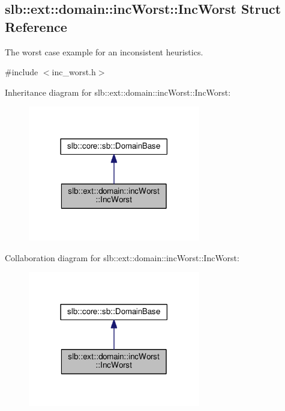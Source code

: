 \hypertarget{structslb_1_1ext_1_1domain_1_1incWorst_1_1IncWorst}{}\subsection{slb\+:\+:ext\+:\+:domain\+:\+:inc\+Worst\+:\+:Inc\+Worst Struct Reference}
\label{structslb_1_1ext_1_1domain_1_1incWorst_1_1IncWorst}


The worst case example for an inconsistent heuristics.  




{\ttfamily \#include $<$inc\+\_\+worst.\+h$>$}



Inheritance diagram for slb\+:\+:ext\+:\+:domain\+:\+:inc\+Worst\+:\+:Inc\+Worst\+:\nopagebreak
\begin{figure}[H]
\begin{center}
\leavevmode
\includegraphics[width=213pt]{structslb_1_1ext_1_1domain_1_1incWorst_1_1IncWorst__inherit__graph}
\end{center}
\end{figure}


Collaboration diagram for slb\+:\+:ext\+:\+:domain\+:\+:inc\+Worst\+:\+:Inc\+Worst\+:\nopagebreak
\begin{figure}[H]
\begin{center}
\leavevmode
\includegraphics[width=213pt]{structslb_1_1ext_1_1domain_1_1incWorst_1_1IncWorst__coll__graph}
\end{center}
\end{figure}
